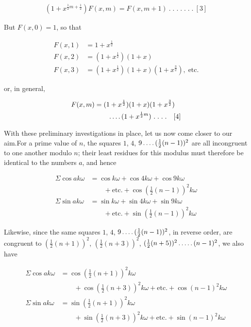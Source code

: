\[
\begin{aligned}
(1+x^{\frac12m+\frac12})F(x,m)=F(x,m+1)\ .\; .\; .\; .\; .\; .\; .\ [3]
\end{aligned}
\]

But $F(x,0)=1$, so that

\[
\begin{aligned}
F(x,1)&=1+x^{\frac12}\\
F(x,2)&=(1+x^{\frac12})(1+x)\\
F(x,3)&=(1+x^{\frac12})(1+x)(1+x^{\frac32}),\;\text{etc.}
\end{aligned}
\]

or, in general,

\[
\begin{aligned}
F(x,m)&=(1+x^{\frac12})(1+x)(1+x^{\frac32})\\&\qquad\dotsfour(1+x^{\frac12m})\ .\; .\; .\; .\quad[4]
\end{aligned}
\]


With these preliminary investigations in place, let us now come closer to our aim.\quad For a prime value of $n$, the squares $1$, $4$, $9\mathinner{.\,.\,.\,.}(\frac12(n-1))^2$ are all incongruent to one another modulo $n$; their least residues for this modulus must therefore be identical to the numbers $a$, and hence

\[
\begin{aligned}
\Sigma\cos ak\omega&=\cos k\omega+\cos4k\omega+\cos9k\omega\\&\qquad+\text{etc.}+\cos(\tfrac12(n-1))^2k\omega\\
\Sigma\sin ak\omega&=\sin k\omega+\sin4k\omega+\sin9k\omega\\&\qquad+\text{etc.}+\sin(\tfrac12(n-1))^2k\omega
\end{aligned}
\]

Likewise, since the same squares $1$, $4$, $9\mathinner{.\,.\,.\,.}(\frac12(n-1))^2$, in reverse order, are congruent to $(\frac12(n+1))^2$, $(\frac12(n+3))^2$, $(\frac12(n+5))^2\mathinner{.\,.\,.\,.\,.}(n-1)^2$, we also have


\[
\begin{aligned}
\Sigma\cos ak\omega&=\cos(\tfrac12(n+1))^2k\omega\\&\qquad+\cos(\tfrac12(n+3))^2k\omega+\text{etc.}+\cos(n-1)^2k\omega\\
\Sigma\sin ak\omega&=\sin(\tfrac12(n+1))^2k\omega\\&\qquad+\sin(\tfrac12(n+3))^2k\omega+\text{etc.}+\sin(n-1)^2k\omega
\end{aligned}
\]

